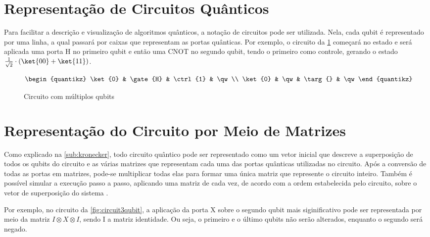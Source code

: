 \section{Representação de Circuitos Quânticos}
Para facilitar a descrição e visualização de algoritmos quânticos, a notação de circuitos pode ser utilizada. Nela, cada qubit é representado por uma linha, a qual passará por caixas que representam as portas quânticas. Por exemplo, o circuito da \cref{fig:bellcircuit} começará no estado  e será aplicada uma porta H no primeiro qubit e então uma CNOT no segundo qubit, tendo o primeiro como controle, gerando o estado $\frac{1}{\sqrt{2}} \cdot (\ket{00}+\ket{11})$.

\begin{figure}[ht]
  \[
    \begin{quantikz}
      \ket{0} & \gate{H} & \ctrl{1} & \qw \\
      \ket{0} & \qw      & \targ{}  & \qw
    \end{quantikz}
  \]
  \caption{Circuito com múltiplos qubits}
  \label{fig:bellcircuit}
\end{figure}

\section{Representação do Circuito por Meio de Matrizes}\label{sec:matrixrep}

Como explicado na \cref{sub:kronecker}, todo circuito quântico pode ser representado como um vetor inicial que descreve a superposição de todos os qubits do circuito e as várias matrizes que representam cada uma das portas quânticas utilizadas no circuito. Após a conversão de todas as portas em matrizes, pode-se multiplicar todas elas para formar uma única matriz que represente o circuito inteiro. Também é possível simular a execução passo a passo, aplicando uma matriz de cada vez, de acordo com a ordem estabelecida pelo circuito, sobre o vetor de superposição do sistema \cite{nielsen2010quantum}.

Por exemplo, no circuito da \cref{fig:circuit3qubit}, a aplicação da porta X sobre o segundo qubit mais siginificativo pode ser representada por meio da matriz $I \otimes X \otimes I$, sendo I a matriz identidade. Ou seja, o primeiro e o último qubits não serão alterados, enquanto o segundo será negado.

